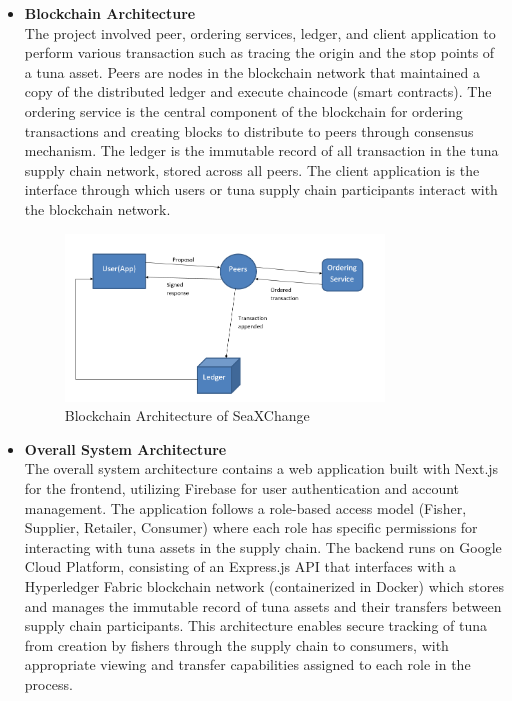 \begin{itemize}
	\item \textbf{Blockchain Architecture}
	\\The project involved peer, ordering services, ledger, and client application to perform various transaction such as tracing the origin and the stop points of a tuna asset. Peers are nodes in the blockchain network that maintained a copy of the distributed ledger and execute chaincode (smart contracts). The ordering service is the central component of the blockchain for ordering transactions and creating blocks to distribute to peers through consensus mechanism. The ledger is the immutable record of all transaction in the tuna supply chain network, stored across all peers. The client application is the interface through which users or tuna supply chain participants interact with the blockchain network.
	
	\begin{figure}[H]
		\centering
		\includegraphics[width=0.8\textwidth]{SeaXChange_model.png}
		\caption{Blockchain Architecture of SeaXChange}
		\label{fig:blockchain_model}
	\end{figure}
	
	\item \textbf{Overall System Architecture}
	\\The overall system architecture contains a web application built with Next.js for the frontend, utilizing Firebase for user authentication and account management. The application follows a role-based access model (Fisher, Supplier, Retailer, Consumer) where each role has specific permissions for interacting with tuna assets in the supply chain. The backend runs on Google Cloud Platform, consisting of an Express.js API that interfaces with a Hyperledger Fabric blockchain network (containerized in Docker) which stores and manages the immutable record of tuna assets and their transfers between supply chain participants. This architecture enables secure tracking of tuna from creation by fishers through the supply chain to consumers, with appropriate viewing and transfer capabilities assigned to each role in the process.
	

\end{itemize}
